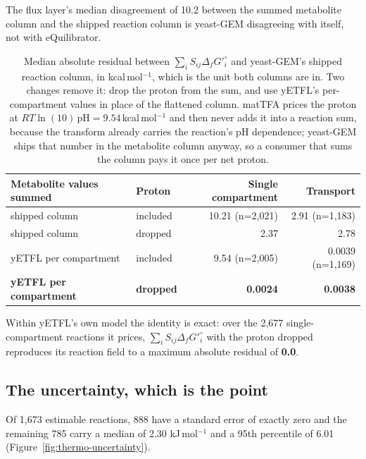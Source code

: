 The flux layer's median disagreement of 10.2 between the summed metabolite column and the
shipped reaction column is yeast-GEM disagreeing with itself, not with eQuilibrator.

\begin{table}[!htbp]
  \centering
  \footnotesize
  \caption[Reconciling the two shipped columns]{Median absolute residual between
  $\sum_i S_{ij}\Delta_f G'^\circ_i$ and yeast-GEM's shipped reaction column, in
  kcal\,mol$^{-1}$, which is the unit both columns are in. Two changes remove it: drop the
  proton from the sum, and use yETFL's per-compartment values in place of the flattened
  column. matTFA prices the proton at $RT\ln(10)\,\mathrm{pH} = 9.54$\,kcal\,mol$^{-1}$ and
  then never adds it into a reaction sum, because the transform already carries the
  reaction's pH dependence; yeast-GEM ships that number in the metabolite column anyway, so a
  consumer that sums the column pays it once per net proton.}
  \label{tab:shipped-self-consistency}
  \begin{tabular}{@{}llrr@{}}
    \hline
    Metabolite values summed & Proton & Single compartment & Transport \\
    \hline
    shipped column & included & 10.21 (n=2{,}021) & 2.91 (n=1{,}183) \\
    shipped column & dropped & 2.37 & 2.78 \\
    yETFL per compartment & included & 9.54 (n=2{,}005) & 0.0039 (n=1{,}169) \\
    \textbf{yETFL per compartment} & \textbf{dropped} & \textbf{0.0024} & \textbf{0.0038} \\
    \hline
  \end{tabular}
\end{table}

 Within yETFL's own model the identity is exact: over the 2{,}677
single-compartment reactions it prices, $\sum_i S_{ij}\Delta_f G'^\circ_i$ with the proton
dropped reproduces its reaction field to a maximum absolute residual of \textbf{0.0}.

\subsection{The uncertainty, which is the point}

Of 1{,}673 estimable reactions, 888 have a standard error of exactly zero and the remaining
785 carry a median of 2.30 kJ\,mol$^{-1}$ and a 95th percentile of 6.01
(Figure~\ref{fig:thermo-uncertainty}).

